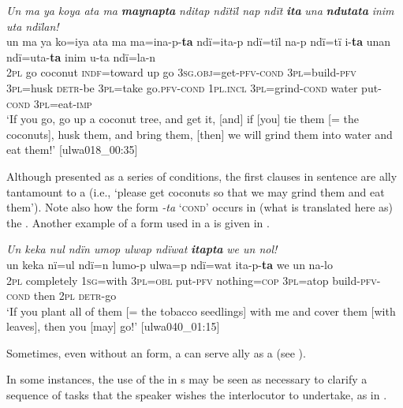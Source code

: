 \ea%
    \label{ex:syntax:262}
          \textit{Un ma ya koya ata ma} \textbf{\textit{maynapta}} \textit{nditap ndïtïl nap ndït} \textbf{\textit{ita}} \textit{una} \textbf{\textit{ndutata}} \textit{inim uta ndïlan!}\\
\gll    un  ma  ya      ko=iya      ata  ma  ma=ina-p-\textbf{ta} ndï=ita-p    ndï=tïl    na-p    ndï=tï    i-\textbf{ta}     unan    ndï=uta-\textbf{ta}      inim  u-ta    ndï=la-n\\
    \textsc{2pl}  go  coconut  \textsc{indf=}toward  up  go  3\textsc{sg.obj}=get-\textsc{pfv-cond}    3\textsc{pl}=build-\textsc{pfv}  \textsc{3pl}=husk  \textsc{detr-}be  3\textsc{pl}=take  go.\textsc{pfv-cond}    1\textsc{pl.incl}  \textsc{3pl=}grind\textsc{{}-cond} water  put\textsc{{}-cond}  \textsc{3pl}=eat-\textsc{imp}\\
\glt `If you go, go up a coconut tree, and get it, [and] if [you] tie them [= the coconuts], husk them, and bring them, [then] we will grind them into water and eat them!’ [ulwa018\_00:35]
\z

Although presented as a series of conditions, the first clauses in sentence  are ally tantamount to a  (i.e., ‘please get coconuts so that we may grind them and eat them’). Note also how the  form \textit{-ta} ‘\textsc{cond}’ occurs in (what is translated here as) the . Another example of a  form used in a  is given in .

\ea%
    \label{ex:syntax:263}
          \textit{Un keka nul ndïn umop ulwap ndïwat} \textbf{\textit{itapta}} \textit{we un nol!}\\
\gll    un  keka      nï=ul    ndï=n    lumo-p    ulwa=p ndï=wat  ita-p-\textbf{ta}      we    un  na-lo\\
    2\textsc{pl}  completely  1\textsc{sg}=with  3\textsc{pl=obl}  put-\textsc{pfv}  nothing=\textsc{cop}    3\textsc{pl}=atop  build-\textsc{pfv-cond}  then  2\textsc{pl}  \textsc{detr-}go\\
\glt `If you plant all of them [= the tobacco seedlings] with me and cover them [with leaves], then you [may] go!’ [ulwa040\_01:15]
\z

Sometimes, even without an  form, a  can serve ally as a  (see ).

  In some instances, the use of the  in s may be seen as necessary to clarify a sequence of tasks that the speaker wishes the interlocutor to undertake, as in .


